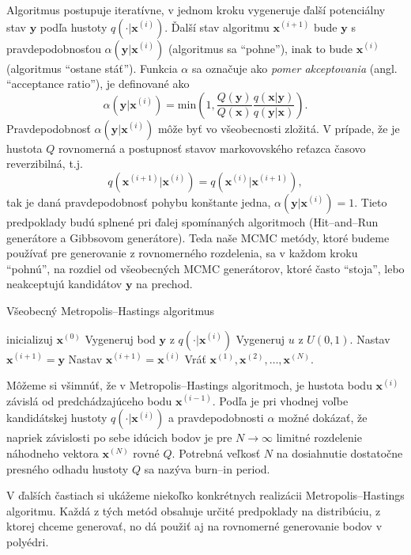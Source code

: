 Algoritmus postupuje iteratívne, v jednom kroku vygeneruje ďalší potenciálny stav $\mathbf y$ podľa hustoty $q(\cdot |\mathbf x^{(i)})$. Ďalší stav algoritmu $\mathbf x^{(i+1)}$ bude $\mathbf y$ s pravdepodobnosťou $\alpha (\mathbf y|\mathbf x^{(i)})$ (algoritmus sa ``pohne''), inak to bude $\mathbf x^{(i)}$ (algoritmus ``ostane stáť''). Funkcia $\alpha$ sa označuje ako \textit{pomer akceptovania} (angl. ``acceptance ratio''), je definované ako $$\alpha (\mathbf y|\mathbf x^{(i)}) = \text{min}\left( 1, \frac{Q(\mathbf y)}{Q(\mathbf x)} \frac {q(\mathbf x|\mathbf y)}{q(\mathbf y | \mathbf x)} \right).$$ 
Pravdepodobnosť $\alpha (\mathbf y|\mathbf x^{(i)})$ môže byť vo všeobecnosti zložitá. V prípade, že je hustota $Q$ rovnomerná a postupnosť stavov markovovského reťazca časovo reverzibilná, t.j. $$q(\mathbf x^{(i+1)}|\mathbf x^{(i)})=q(\mathbf x^{(i)}|\mathbf x^{(i+1)}),$$ tak je daná pravdepodobnosť pohybu konštante jedna, $\alpha (\mathbf y|\mathbf x^{(i)})=1$. Tieto predpoklady budú splnené pri ďalej spomínaných algoritmoch (Hit--and--Run generátore a Gibbsovom generátore). Teda naše MCMC metódy, ktoré budeme používať pre generovanie z rovnomerného rozdelenia, sa v každom kroku ``pohnú'', na rozdiel od všeobecných MCMC generátorov, ktoré často ``stoja'', lebo neakceptujú kandidátov $\mathbf y$ na prechod.

\begin{algorithm}[H]
	\caption{Všeobecný Metropolis--Hastings algoritmus \cite{metropolis-hastings_chib}}
	\label{metropolis-hastings}
	\begin{algorithmic}[1]
		\State inicializuj $\mathbf x^{(0)}$
			\State Vygeneruj bod $\mathbf y$ z $q(\cdot|\mathbf x^{(i)})$
			\State Vygeneruj $u$ z $U(0,1)$.
				\State Nastav $\mathbf x^{(i+1)}=\mathbf y$
			\Else
				\State Nastav $\mathbf x^{(i+1)}=\mathbf x^{(i)}$
			\EndIf
		\EndFor
		\State Vráť ${\mathbf x^{(1)},\mathbf x^{(2)},\dots,\mathbf x^{(N)}}$.
	\end{algorithmic}
\end{algorithm}

Môžeme si všimnúť, že v Metropolis--Hastings algoritmoch, je hustota bodu $\mathbf x^{(i)}$ závislá od predchádzajúceho bodu $\mathbf x^{(i-1)}$. Podľa \cite{metropolis-hastings_chib} je pri vhodnej voľbe kandidátskej hustoty $q(\cdot|\mathbf x^{(i)})$ a pravdepodobnosti $\alpha$ možné dokázať, že napriek závislosti po sebe idúcich bodov je pre $N \rightarrow \infty$ limitné rozdelenie náhodneho vektora $\mathbf x^{(N)}$ rovné $Q$. Potrebná veľkosť $N$ na dosiahnutie dostatočne presného odhadu hustoty $Q$ sa nazýva burn--in period.

V ďalších častiach si ukážeme niekoľko konkrétnych realizácii Metropolis--Hastings algoritmu. Každá z tých metód obsahuje určité predpoklady na distribúciu, z ktorej chceme generovať, no dá použiť aj na rovnomerné generovanie bodov v polyédri.